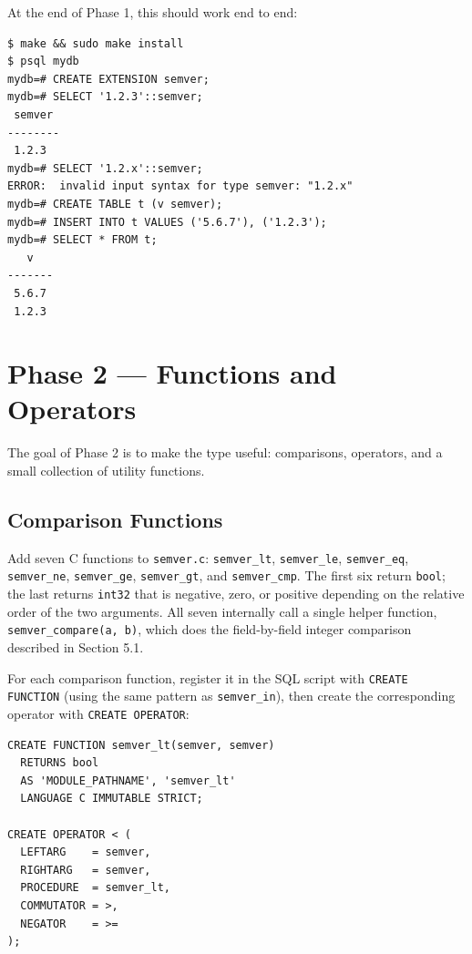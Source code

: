 \documentclass[11pt,a4paper]{article}
\begin{document}
At the end of Phase 1, this should work end to end:

\begin{codebox}
\begin{lstlisting}
$ make && sudo make install
$ psql mydb
mydb=# CREATE EXTENSION semver;
mydb=# SELECT '1.2.3'::semver;
 semver
--------
 1.2.3
mydb=# SELECT '1.2.x'::semver;
ERROR:  invalid input syntax for type semver: "1.2.x"
mydb=# CREATE TABLE t (v semver);
mydb=# INSERT INTO t VALUES ('5.6.7'), ('1.2.3');
mydb=# SELECT * FROM t;
   v
-------
 5.6.7
 1.2.3
\end{lstlisting}
\end{codebox}

\section{Phase 2 --- Functions and Operators}

The goal of Phase 2 is to make the type useful: comparisons, operators, and a small collection of utility functions.

\subsection{Comparison Functions}
Add seven C functions to \texttt{semver.c}: \texttt{semver\_lt}, \texttt{semver\_le}, \texttt{semver\_eq}, \texttt{semver\_ne}, \texttt{semver\_ge}, \texttt{semver\_gt}, and \texttt{semver\_cmp}. The first six return \texttt{bool}; the last returns \texttt{int32} that is negative, zero, or positive depending on the relative order of the two arguments. All seven internally call a single helper function, \texttt{semver\_compare(a, b)}, which does the field-by-field integer comparison described in Section 5.1.

For each comparison function, register it in the SQL script with \texttt{CREATE FUNCTION} (using the same pattern as \texttt{semver\_in}), then create the corresponding operator with \texttt{CREATE OPERATOR}:

\begin{codebox}
\begin{lstlisting}
CREATE FUNCTION semver_lt(semver, semver)
  RETURNS bool
  AS 'MODULE_PATHNAME', 'semver_lt'
  LANGUAGE C IMMUTABLE STRICT;

CREATE OPERATOR < (
  LEFTARG    = semver,
  RIGHTARG   = semver,
  PROCEDURE  = semver_lt,
  COMMUTATOR = >,
  NEGATOR    = >=
);
\end{lstlisting}
\end{codebox}
\end{document}
